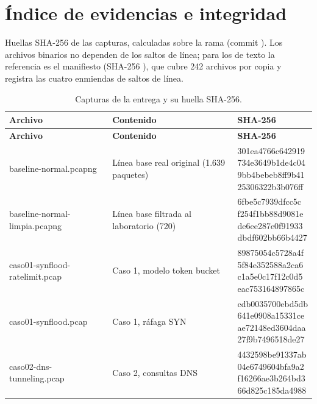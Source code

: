 \chapter{Índice de evidencias e integridad}
Huellas SHA-256 de las capturas, calculadas sobre la rama  (commit ). Los archivos binarios no dependen de los saltos de línea; para los de texto la referencia es el manifiesto  (SHA-256 ), que cubre 242 archivos por copia y registra las cuatro enmiendas de saltos de línea.

{\small\renewcommand{\arraystretch}{1.2}
\begin{longtable}{@{}p{5cm}p{5.6cm}p{3cm}@{}}
\caption{Capturas de la entrega y su huella SHA-256.}\\\toprule
\textbf{Archivo} & \textbf{Contenido} & \textbf{SHA-256}\\\midrule\endfirsthead
\toprule\textbf{Archivo} & \textbf{Contenido} & \textbf{SHA-256}\\\midrule\endhead
{\ttfamily\scriptsize baseline-normal.pcapng} & Línea base real original (1.639 paquetes) & \cod{\scriptsize 301ea4766c642919\newline 734e3649b1de4c04\newline 9bb4bebeb8ff9b41\newline 25306322b3b076ff}\\
{\ttfamily\scriptsize baseline-normal-limpia.pcapng} & Línea base filtrada al laboratorio (720) & \cod{\scriptsize 6fbe5c7939dfcc5c\newline f254f1bb88d9081e\newline de6ee287e0f91933\newline dbdf602bb66b4427}\\
{\ttfamily\scriptsize caso01-synflood-ratelimit.pcap} & Caso 1, modelo token bucket & \cod{\scriptsize 89875054c5728a4f\newline 5f84e352588a2ca6\newline c1a5e0c17f12c0d5\newline eac753164897865c}\\
{\ttfamily\scriptsize caso01-synflood.pcap} & Caso 1, ráfaga SYN & \cod{\scriptsize cdb0035700ebd5db\newline 641e0908a15331ce\newline ae72148ed3604daa\newline 27f9b7496518de27}\\
{\ttfamily\scriptsize caso02-dns-tunneling.pcap} & Caso 2, consultas DNS & \cod{\scriptsize 4432598be91337ab\newline 04e6749604bfa9a2\newline f16266ae3b264bd3\newline 66d825c185da4988}\\

\end{longtable}}
